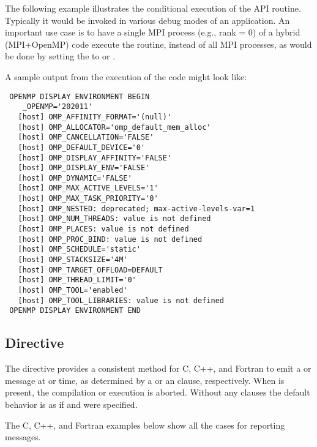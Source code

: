 The following example illustrates the conditional execution of the API
 routine.  Typically it would be invoked in
various debug modes of an application. 
An important use case is to have a single MPI process (e.g., rank = 0) 
of a hybrid (MPI+OpenMP) code execute the routine,
instead of all MPI processes, as would be done by 
setting the  to  or .


\clearpage

A sample output from the execution of the code might look like:
{\small\begin{verbatim}
 OPENMP DISPLAY ENVIRONMENT BEGIN
    _OPENMP='202011'
   [host] OMP_AFFINITY_FORMAT='(null)'
   [host] OMP_ALLOCATOR='omp_default_mem_alloc'
   [host] OMP_CANCELLATION='FALSE'
   [host] OMP_DEFAULT_DEVICE='0'
   [host] OMP_DISPLAY_AFFINITY='FALSE'
   [host] OMP_DISPLAY_ENV='FALSE'
   [host] OMP_DYNAMIC='FALSE'
   [host] OMP_MAX_ACTIVE_LEVELS='1'
   [host] OMP_MAX_TASK_PRIORITY='0'
   [host] OMP_NESTED: deprecated; max-active-levels-var=1
   [host] OMP_NUM_THREADS: value is not defined
   [host] OMP_PLACES: value is not defined
   [host] OMP_PROC_BIND: value is not defined
   [host] OMP_SCHEDULE='static'
   [host] OMP_STACKSIZE='4M'
   [host] OMP_TARGET_OFFLOAD=DEFAULT
   [host] OMP_THREAD_LIMIT='0'
   [host] OMP_TOOL='enabled'
   [host] OMP_TOOL_LIBRARIES: value is not defined
 OPENMP DISPLAY ENVIRONMENT END
\end{verbatim}}


\subsection{ Directive}
\label{subsec:error}

The  directive provides a consistent method for C, C++, and Fortran to emit a  or
 message at  or  time, as determined by a  
or an  clause, respectively. When  is present, the compilation 
or execution is aborted. Without any clauses the default behavior is as if  
and  were specified.

The C, C++, and Fortran examples below show all the cases for reporting messages.



